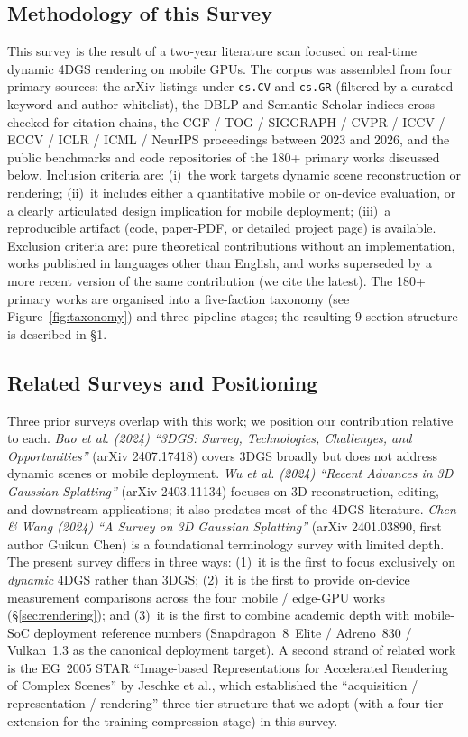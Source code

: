 \subsection{Methodology of this Survey}
This survey is the result of a two-year literature scan focused
on real-time dynamic 4DGS rendering on mobile GPUs. The corpus
was assembled from four primary sources: the arXiv listings
under \texttt{cs.CV} and \texttt{cs.GR} (filtered by a
curated keyword and author whitelist), the DBLP and
Semantic-Scholar indices cross-checked for citation chains, the
CGF / TOG / SIGGRAPH / CVPR / ICCV / ECCV / ICLR / ICML / NeurIPS
proceedings between 2023 and 2026, and the public benchmarks
and code repositories of the 180+ primary works discussed below.
Inclusion criteria are: (i)~the work targets dynamic scene
reconstruction or rendering; (ii)~it includes either a
quantitative mobile or on-device evaluation, or a clearly
articulated design implication for mobile deployment;
(iii)~a reproducible artifact (code, paper-PDF, or detailed
project page) is available. Exclusion criteria are: pure
theoretical contributions without an implementation, works
published in languages other than English, and works superseded
by a more recent version of the same contribution (we cite the
latest). The 180+ primary works are organised into a
five-faction taxonomy (see Figure~\ref{fig:taxonomy}) and three
pipeline stages; the resulting 9-section structure is
described in \S1.

\subsection{Related Surveys and Positioning}
Three prior surveys overlap with this work; we position our
contribution relative to each. \emph{Bao et al. (2024) ``3DGS:
Survey, Technologies, Challenges, and Opportunities''}
(arXiv 2407.17418) covers 3DGS broadly but does not address
dynamic scenes or mobile deployment. \emph{Wu et al. (2024)
``Recent Advances in 3D Gaussian Splatting''} (arXiv 2403.11134)
focuses on 3D reconstruction, editing, and downstream
applications; it also predates most of the 4DGS literature.
\emph{Chen \& Wang (2024) ``A Survey on 3D Gaussian
Splatting''} (arXiv 2401.03890, first author Guikun Chen) is a
foundational terminology survey with limited depth. The present survey
differs in three ways: (1)~it is the first to focus
exclusively on \emph{dynamic} 4DGS rather than 3DGS;
(2)~it is the first to provide on-device measurement
comparisons across the four mobile / edge-GPU works
(\S\ref{sec:rendering}); and (3)~it is the first to combine
academic depth with mobile-SoC deployment reference numbers
(Snapdragon~8~Elite / Adreno~830 / Vulkan~1.3 as the
canonical deployment target). A second strand of related work is the
EG~2005 STAR ``Image-based Representations for Accelerated
Rendering of Complex Scenes'' by Jeschke et al., which
established the ``acquisition / representation / rendering''
three-tier structure that we adopt (with a four-tier extension
for the training-compression stage) in this survey.

